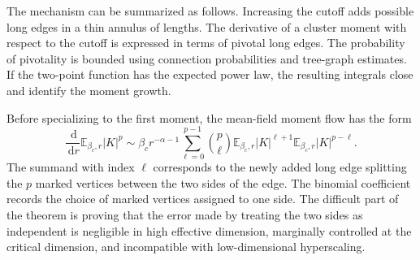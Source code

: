 \documentclass[11pt,reqno]{book}
\numberwithin{equation}{chapter}
\theoremstyle{plain}
\theoremstyle{definition}
\theoremstyle{remark}
\newcommand{\E}{\mathbb E}
\newcommand{\1}{\mathbf 1}
\newcommand{\dd}{\,\mathrm d}
\begin{document}
The mechanism can be summarized as follows. Increasing the cutoff adds possible long edges in a thin annulus of lengths. The derivative of a cluster moment with respect to the cutoff is expressed in terms of pivotal long edges. The probability of pivotality is bounded using connection probabilities and tree-graph estimates. If the two-point function has the expected power law, the resulting integrals close and identify the moment growth.

Before specializing to the first moment, the mean-field moment flow has the form
\[
  \frac{\dd}{\dd r}\E_{\beta_c,r}|K|^p
  \sim
  \beta_c r^{-\alpha-1}
  \sum_{\ell=0}^{p-1}
  \binom p\ell
  \E_{\beta_c,r}|K|^{\ell+1}
  \E_{\beta_c,r}|K|^{p-\ell}.
\]
The summand with index \(\ell\) corresponds to the newly added long edge splitting the \(p\) marked vertices between the two sides of the edge. The binomial coefficient records the choice of marked vertices assigned to one side. The difficult part of the theorem is proving that the error made by treating the two sides as independent is negligible in high effective dimension, marginally controlled at the critical dimension, and incompatible with low-dimensional hyperscaling.
\end{document}
